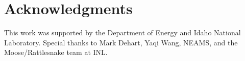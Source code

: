 \documentclass{anstrans}
\begin{document}
\section{Acknowledgments}

This work was supported by the Department of Energy and Idaho National Laboratory.  Special thanks to Mark Dehart, Yaqi Wang, NEAMS, and the Moose/Rattlesnake team at INL.



\end{document}
